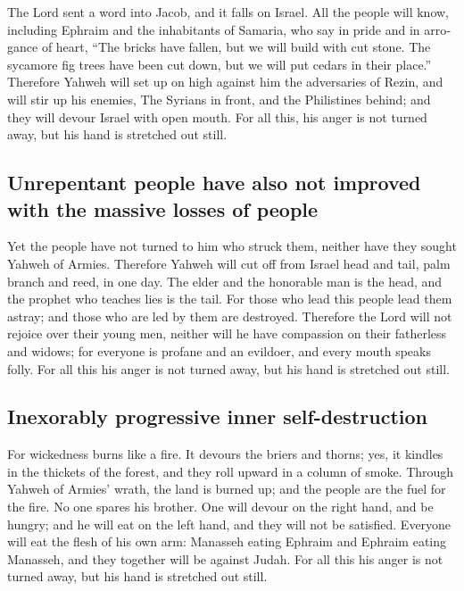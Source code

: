 \begin{paracol}{2}
\begin{otherlanguage}{english}
 The Lord sent a word into Jacob, and it falls on Israel.
 All the people will know, including Ephraim and the
inhabitants of Samaria, who say in pride and in arrogance of heart,
 ``The bricks have fallen, but we will build with cut
stone. The sycamore fig trees have been cut down, but we will put cedars
in their place.''  Therefore Yahweh will set up on high
against him the adversaries of Rezin, and will stir up his enemies,
 The Syrians in front, and the Philistines behind; and
they will devour Israel with open mouth. For all this, his anger is not
turned away, but his hand is stretched out still.

\hypertarget{unrepentant-people-have-also-not-improved-with-the-massive-losses-of-people}{%
\subsection{Unrepentant people have also not improved with the massive
losses of
people}\label{unrepentant-people-have-also-not-improved-with-the-massive-losses-of-people}}

 Yet the people have not turned to him who struck them,
neither have they sought Yahweh of Armies.  Therefore
Yahweh will cut off from Israel head and tail, palm branch and reed, in
one day.  The elder and the honorable man is the head,
and the prophet who teaches lies is the tail.  For those
who lead this people lead them astray; and those who are led by them are
destroyed.  Therefore the Lord will not rejoice over
their young men, neither will he have compassion on their fatherless and
widows; for everyone is profane and an evildoer, and every mouth speaks
folly. For all this his anger is not turned away, but his hand is
stretched out still.

\hypertarget{inexorably-progressive-inner-self-destruction}{%
\subsection{Inexorably progressive inner
self-destruction}\label{inexorably-progressive-inner-self-destruction}}

 For wickedness burns like a fire. It devours the briers
and thorns; yes, it kindles in the thickets of the forest, and they roll
upward in a column of smoke.  Through Yahweh of Armies'
wrath, the land is burned up; and the people are the fuel for the fire.
No one spares his brother.  One will devour on the right
hand, and be hungry; and he will eat on the left hand, and they will not
be satisfied. Everyone will eat the flesh of his own arm:
 Manasseh eating Ephraim and Ephraim eating Manasseh, and
they together will be against Judah. For all this his anger is not
turned away, but his hand is stretched out still.


\end{otherlanguage}
\end{paracol}
